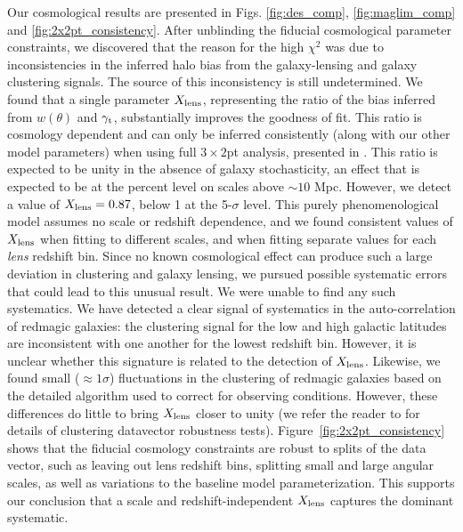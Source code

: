 \documentclass[fleqn,usenatbib]{mnras}
\newcommand{\redmagic}{\texttt{redMaGiC} }
\begin{document}
Our cosmological results are presented in Figs. \ref{fig:des_comp}, \ref{fig:maglim_comp} and \ref{fig:2x2pt_consistency}. After unblinding the fiducial cosmological parameter constraints, we discovered that the reason for the high $\chi^2$ was due to inconsistencies in the inferred halo bias from the galaxy-lensing and galaxy clustering signals.  The source of this inconsistency is still undetermined. We found that a single parameter $X_{\rm lens}$, representing the ratio of the bias inferred from $w(\theta)$ and $\gamma_{\rm t}$, substantially improves the goodness of fit. This ratio is cosmology dependent and can only be inferred consistently (along with our other model parameters)  when using full $3\times2$pt analysis, presented in \citet{y3-3x2ptkp}.
This ratio is expected to be unity in the absence of galaxy stochasticity, an effect that is expected to be at the percent level on scales above $\sim 10$ Mpc. However, we detect a value of $X_{\rm lens}=0.87$, below 1 at the 5-$\sigma$ level. This purely phenomenological model assumes no scale or redshift dependence, and we found consistent values of $X_{\rm lens}$ when fitting to different scales, and when fitting separate values for each \emph{lens} redshift bin. Since no known cosmological effect can produce such a large deviation in clustering and galaxy lensing, we pursued possible systematic errors that could lead to this unusual result. 
We were unable to find any such systematics.  We have detected a clear signal of systematics in the auto-correlation of redmagic galaxies: the clustering signal for the low and high galactic latitudes are inconsistent with one another for the lowest redshift bin.  However, it is unclear whether this signature is related to the detection of $X_{\rm lens}$.  Likewise, we found small ($\approx 1\sigma$) fluctuations in the clustering of redmagic galaxies based on the detailed algorithm used to correct for observing conditions. However, these differences do little to bring $X_{\rm lens}$ closer to unity (we refer the reader to \citep{y3-galaxyclustering} for details of clustering datavector robustness tests).
Figure~\ref{fig:2x2pt_consistency} shows that the fiducial cosmology constraints are robust to splits of the data vector, such as leaving out lens redshift bins, splitting small and large angular scales, as well as variations to the baseline model parameterization. This supports our conclusion that a scale and redshift-independent $X_{\rm lens}$ captures the dominant systematic.
\end{document}

